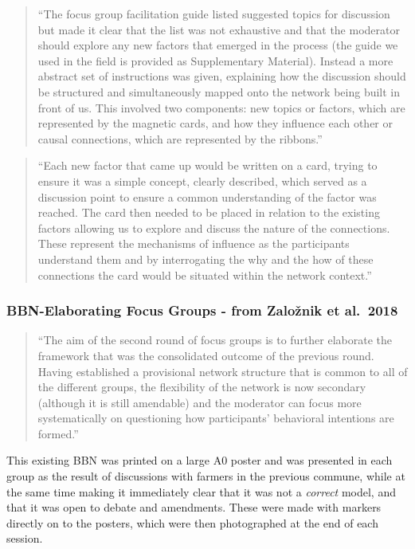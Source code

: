 \documentclass[]{article}
\begin{document}
\begin{quote}
``The focus group facilitation guide listed suggested topics for
discussion but made it clear that the list was not exhaustive and that
the moderator should explore any new factors that emerged in the process
(the guide we used in the field is provided as Supplementary Material).
Instead a more abstract set of instructions was given, explaining how
the discussion should be structured and simultaneously mapped onto the
network being built in front of us. This involved two components: new
topics or factors, which are represented by the magnetic cards, and how
they influence each other or causal connections, which are represented
by the ribbons.''
\end{quote}

\begin{quote}
``Each new factor that came up would be written on a card, trying to
ensure it was a simple concept, clearly described, which served as a
discussion point to ensure a common understanding of the factor was
reached. The card then needed to be placed in relation to the existing
factors allowing us to explore and discuss the nature of the
connections. These represent the mechanisms of influence as the
participants understand them and by interrogating the why and the how of
these connections the card would be situated within the network
context.''
\end{quote}

\hypertarget{bbn-elaborating-focus-groups---from-zaloznik-et-al.2018}{%
\subsubsection{BBN-Elaborating Focus Groups - from Založnik et
al.~2018}\label{bbn-elaborating-focus-groups---from-zaloznik-et-al.2018}}

\begin{quote}
``The aim of the second round of focus groups is to further elaborate
the framework that was the consolidated outcome of the previous round.
Having established a provisional network structure that is common to all
of the different groups, the flexibility of the network is now secondary
(although it is still amendable) and the moderator can focus more
systematically on questioning how participants' behavioral intentions
are formed.''
\end{quote}

This existing BBN was printed on a large A0 poster and was presented in
each group as the result of discussions with farmers in the previous
commune, while at the same time making it immediately clear that it was
not a \emph{correct} model, and that it was open to debate and
amendments. These were made with markers directly on to the posters,
which were then photographed at the end of each session.
\end{document}
